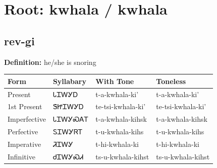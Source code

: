 \documentclass{article}%
\begin{document}
%
\normalsize%
\section*{Root: kwhala / kwhala}%
\subsection*{rev-gi}%
\textbf{Definition: }%
he/she is snoring%
\\[0.5em]%
\begin{tabular}{|l|l|l|l|}%
\hline%
\textbf{Form}&\textbf{Syllabary}&\textbf{With Tone}&\textbf{Toneless}\\%
\hline%
Present&ᏓᏆᎳᎩᎠ&t{-}a{-}kwhala{-}ki'&t{-}a{-}kwhala{-}ki'\\%
1st Present&ᏕᏥᏆᎳᎩᎠ&te{-}tsi{-}kwhala{-}ki'&te{-}tsi{-}kwhala{-}ki'\\%
Imperfective&ᏓᏆᎳᎩᏍᎪᎢ&t{-}a{-}kwhala{-}kihsk&t{-}a{-}kwhala{-}kihsk\\%
Perfective&ᏚᏆᎳᎩᏒᎢ&t{-}u{-}kwhala{-}kihs&t{-}u{-}kwhala{-}kihs\\%
Imperative&ᏘᏆᎳᎩ&t{-}hi{-}kwhala{-}ki&t{-}hi{-}kwhala{-}ki\\%
Infinitive&ᏧᏆᎳᎩᏍᏗ&ts{-}u{-}kwhala{-}kihst&ts{-}u{-}kwhala{-}kihst\\%
\hline%
\end{tabular}%
\\[1em]%
\end{document}
